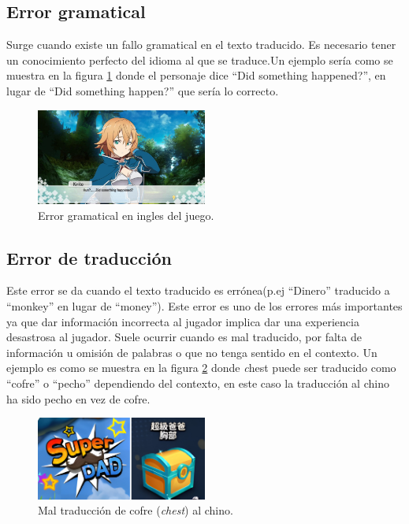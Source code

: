 \subsection{Error gramatical}\label{ErrorGramatical}
Surge cuando existe un fallo gramatical en el texto traducido. Es necesario tener un conocimiento perfecto del idioma al que se traduce.Un ejemplo sería como se muestra en la figura \ref{fig:EGrammar} donde el personaje dice ``Did something happened?'', en lugar de ``Did something happen?'' que sería lo correcto.
\begin{figure}[H]
	\centering
	\includegraphics[width = 0.5\textwidth]{Imagenes/Errores_Localizacion/E_Grammar.png}
	\caption{Error gramatical en ingles del juego.}
	\label{fig:EGrammar}
\end{figure}

\subsection{Error de traducción}\label{ErrorTraducción}
Este error se da cuando el texto traducido es errónea(p.ej ``Dinero'' traducido a ``monkey'' en lugar de ``money''). Este error es uno de los errores más importantes ya que dar información incorrecta al jugador implica dar una experiencia desastrosa al jugador.
Suele ocurrir cuando es mal traducido, por falta de información u omisión de palabras o que no tenga sentido en el contexto. Un ejemplo es como se muestra en la figura \ref{fig:ETraduccion} donde \textit chest puede ser traducido como ``cofre'' o ``pecho'' dependiendo del contexto, en este caso la traducción al chino ha sido pecho en vez de cofre.
\begin{figure}[H]
	\centering
	\includegraphics[width = 0.5\textwidth]{Imagenes/Errores_Localizacion/E_Traduccion.png}
	\caption{Mal traducción de cofre (\textit{chest}) al chino.}
	\label{fig:ETraduccion}
\end{figure}

